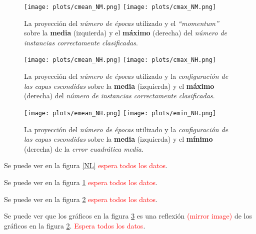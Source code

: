 \documentclass{article}
\newcommand{\red}[1]	    {\textcolor{red}{#1}}
\begin{document}
\begin{figure}[h] 
	\centering
	\texttt{[image: plots/cmean\_NM.png]}
	\texttt{[image: plots/cmax\_NM.png]}
	\caption{La proyección del \emph{número de épocas} utilizado y el \emph{``momentum''} 
			 sobre la \textbf{media} (izquierda) y el \textbf{máximo} (derecha)
			 del \emph{número de instancias correctamente clasificadas}. 
			}
	\label{NM}
\end{figure}

\begin{figure}[h]
	\centering
	\texttt{[image: plots/cmean\_NH.png]}
	\texttt{[image: plots/cmax\_NH.png]}
	\caption{La proyección del \emph{número de épocas} utilizado y la
			 \emph{configuración de las capas escondidas} 
			 sobre la \textbf{media} (izquierda) y el \textbf{máximo} (derecha)
			 del \emph{número de instancias correctamente clasificadas}. 
			}
	\label{NHc}
\end{figure}
	
\begin{figure}[h] 
	\centering
	\texttt{[image: plots/emean\_NH.png]}
	\texttt{[image: plots/emin\_NH.png]}
	\caption{La proyección del \emph{número de épocas} utilizado y la
			 \emph{configuración de las capas escondidas} 
			 sobre la \textbf{media} (izquierda) y el \textbf{mínimo} (derecha)
			 de la \emph{error cuadrática media}. 
			}
	\label{NHe}
\end{figure}	



Se puede ver en la figura \ref{NL} \red{espera todos los datos}.

Se puede ver en la figura \ref{NM} \red{espera todos los datos}.

Se puede ver en la figura \ref{NHc} \red{espera todos los datos}.

Se puede ver que los gráficos en la figura \ref{NHe} es una reflexión \red{(mirror image)} de los gráficos en la figura \ref{NHc}.  \red{Espera todos los datos}.
			 
\end{document}
